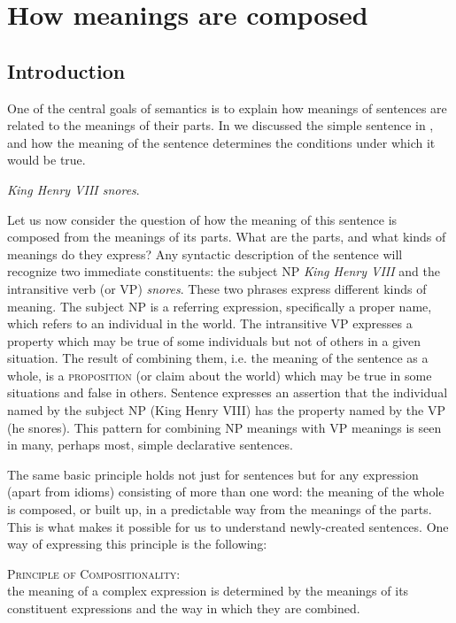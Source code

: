 \chapter{How meanings are composed}\label{sec:12}

\section{Introduction}\label{sec:12.1}

One of the central goals of semantics is to explain how meanings of sentences are related to the meanings of their parts. In  we discussed the simple sentence in , and how the meaning of the sentence determines the conditions under which it would be true.


\ea
\textit{King Henry VIII snores}.
\z


Let us now consider the question of how the meaning of this sentence is composed from the meanings of its parts. What are the parts, and what kinds of meanings do they express? Any syntactic description of the sentence will recognize two immediate constituents: the subject NP \textit{King Henry VIII} and the intransitive verb (or VP) \textit{snores}. These two phrases express different kinds of meaning. The subject NP is a referring expression, specifically a proper name, which refers to an individual in the world. The intransitive VP expresses a property which may be true of some individuals but not of others in a given situation. The result of combining them, i.e. the meaning of the sentence as a whole, is a \textsc{proposition} (or claim about the world) which may be true in some situations and false in others. Sentence  expresses an assertion that the individual named by the subject NP (King Henry VIII) has the property named by the VP (he snores). This pattern for combining NP meanings with VP meanings is seen in many, perhaps most, simple declarative sentences.



The same basic principle holds not just for sentences but for any expression (apart from idioms) consisting of more than one word: the meaning of the whole is composed, or built up, in a predictable way from the meanings of the parts. This is what makes it possible for us to understand newly-created sentences. One way of expressing this principle is the following:


\begin{stylepoints}
\textsc{Principle of Compositionality:\\
}the meaning of a complex expression is determined by the meanings of its constituent expressions and the way in which they are combined.
\end{stylepoints}


